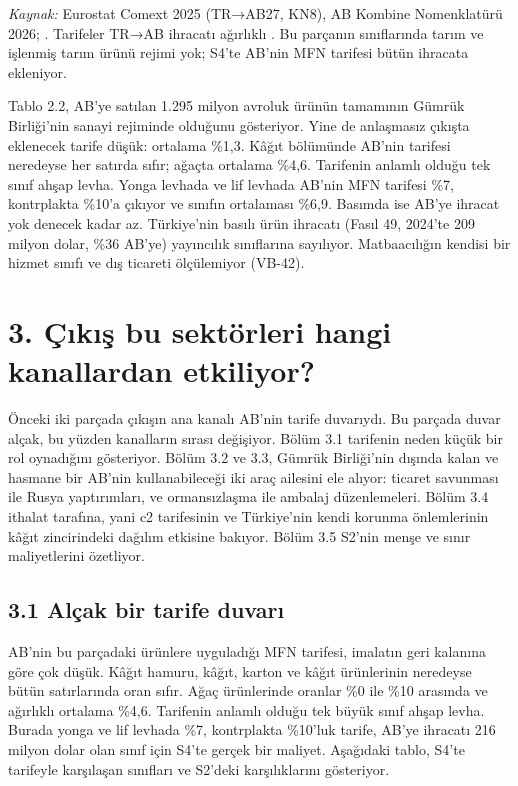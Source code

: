 \endgroup

\emph{Kaynak:} Eurostat Comext 2025 (TR→AB27, KN8), AB Kombine Nomenklatürü 2026; . Tarifeler TR→AB ihracatı ağırlıklı \etiketT{}. Bu parçanın sınıflarında tarım ve işlenmiş tarım ürünü rejimi yok; S4'te AB'nin MFN tarifesi bütün ihracata ekleniyor.

Tablo 2.2, AB'ye satılan 1.295 milyon avroluk ürünün tamamının Gümrük Birliği'nin sanayi rejiminde olduğunu gösteriyor. Yine de anlaşmasız çıkışta eklenecek tarife düşük: ortalama \%1,3. Kâğıt bölümünde AB'nin tarifesi neredeyse her satırda sıfır; ağaçta ortalama \%4,6. Tarifenin anlamlı olduğu tek sınıf ahşap levha. Yonga levhada ve lif levhada AB'nin MFN tarifesi \%7, kontrplakta \%10'a çıkıyor ve sınıfın ortalaması \%6,9. Basımda ise AB'ye ihracat yok denecek kadar az. Türkiye'nin basılı ürün ihracatı (Fasıl 49, 2024'te 209 milyon dolar, \%36 AB'ye) yayıncılık sınıflarına sayılıyor. Matbaacılığın kendisi bir hizmet sınıfı ve dış ticareti ölçülemiyor (VB-42).

\hypertarget{nace_kartlar_16-18-3-uxe7ux131kux131ux15f-bu-sektuxf6rleri-hangi-kanallardan-etkiliyor}{%
\section{3. Çıkış bu sektörleri hangi kanallardan etkiliyor?}\label{nace_kartlar_16-18-3-uxe7ux131kux131ux15f-bu-sektuxf6rleri-hangi-kanallardan-etkiliyor}}

Önceki iki parçada çıkışın ana kanalı AB'nin tarife duvarıydı. Bu parçada duvar alçak, bu yüzden kanalların sırası değişiyor. Bölüm 3.1 tarifenin neden küçük bir rol oynadığını gösteriyor. Bölüm 3.2 ve 3.3, Gümrük Birliği'nin dışında kalan ve hasmane bir AB'nin kullanabileceği iki araç ailesini ele alıyor: ticaret savunması ile Rusya yaptırımları, ve ormansızlaşma ile ambalaj düzenlemeleri. Bölüm 3.4 ithalat tarafına, yani c2 tarifesinin ve Türkiye'nin kendi korunma önlemlerinin kâğıt zincirindeki dağılım etkisine bakıyor. Bölüm 3.5 S2'nin menşe ve sınır maliyetlerini özetliyor.

\hypertarget{nace_kartlar_16-18-31-aluxe7ak-bir-tarife-duvarux131}{%
\subsection{3.1 Alçak bir tarife duvarı}\label{nace_kartlar_16-18-31-aluxe7ak-bir-tarife-duvarux131}}

AB'nin bu parçadaki ürünlere uyguladığı MFN tarifesi, imalatın geri kalanına göre çok düşük. Kâğıt hamuru, kâğıt, karton ve kâğıt ürünlerinin neredeyse bütün satırlarında oran sıfır. Ağaç ürünlerinde oranlar \%0 ile \%10 arasında ve ağırlıklı ortalama \%4,6. Tarifenin anlamlı olduğu tek büyük sınıf ahşap levha. Burada yonga ve lif levhada \%7, kontrplakta \%10'luk tarife, AB'ye ihracatı 216 milyon dolar olan sınıf için S4'te gerçek bir maliyet. Aşağıdaki tablo, S4'te tarifeyle karşılaşan sınıfları ve S2'deki karşılıklarını gösteriyor.


